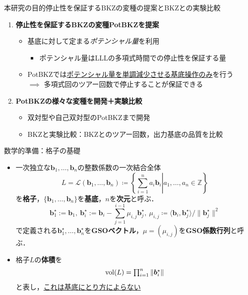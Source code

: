 \documentclass[12pt,aspectratio=169,xcolor=dvipsnames,table,dvipdfmx, leqno]{beamer}
\begin{document}
\begin{frame}{本研究の目的}{停止性を保証するBKZの変種の提案とBKZとの実験比較}
\begin{enumerate}
    \item \textbf{停止性を保証するBKZ\cite{SE94}の変種\alert{PotBKZ}を提案}
    \begin{itemize}
        \item 基底に対して定まる\emph{ポテンシャル量}を利用
        \begin{itemize}
            \item ポテンシャル量はLLL\cite{LLL82}の多項式時間での停止性を保証する量
        \end{itemize}
        \item PotBKZでは\uline{ポテンシャル量を単調減少させる基底操作のみ}を行う\\
        $\implies$ 多項式回のツアー回数で停止することが保証できる
    \end{itemize}
    \item \textbf{PotBKZの様々な変種を開発＋実験比較}
    \begin{itemize}
        \item 双対型や自己双対型のPotBKZまで開発
        \item BKZと実験比較：BKZとのツアー回数，出力基底の品質を比較
    \end{itemize}
\end{enumerate}
\end{frame}

\begin{frame}{数学的準備：格子の基礎}
\begin{Definition}[格子のGSOベクトルと体積]
\begin{itemize}
    \item 一次独立な$\bm{b}_1,\ldots,\bm{b}_n$の整数係数の一次結合全体
    \vspace{-8pt}
    \[
        \textstyle L=\mathcal{L}(\bm{b}_1,\ldots,\bm{b}_n)\coloneq\left\{\left.\sum_{i=1}^n{a_i\bm{b}_i}\right|a_1,\ldots,a_n\in\mathbb{Z}\right\}
    \]
    を\textbf{格子}，$\{\bm{b}_1,\ldots,\bm{b}_n\}$を\textbf{基底}，$n$を\textbf{次元}と呼ぶ．
    \[
        \textstyle \bm{b}_1^\star :=\bm{b}_1,~\bm{b}_i^\star :=\bm{b}_i-\sum_{j=1}^{i-1}\mu_{i,j}\bm{b}_j^\star,~\mu_{i, j} \coloneqq {\langle \bm{b}_i, \bm{b}_j^\star\rangle/\| \bm{b}_j^\star \|^2}%
    \]
    で定義される$\bm{b}_1^\star,\ldots,\bm{b}_n^\star$を\textbf{GSOベクトル}，$\mu=(\mu_{i, j})$を\textbf{GSO係数行列}と呼ぶ．
\item 
格子$L$の\textbf{体積}を
\[
    \textstyle\mathrm{vol}(L)=\prod_{i=1}^n\norm{\bm{b}_i^\star}
\]
と表し，\uline{これは基底にとり方によらない}
\end{itemize}
\end{Definition}
\end{frame}
\end{document}
